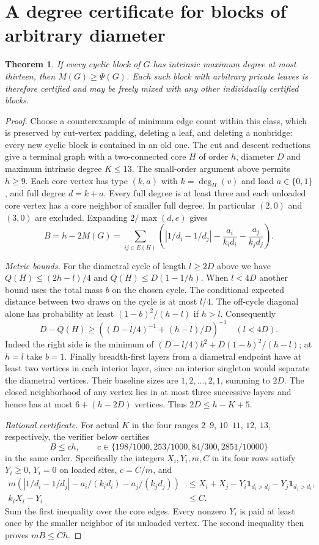 \documentclass[11pt,a4paper]{article}
\newtheorem{theorem}{Theorem}[section]
\begin{document}
\section{A degree certificate for blocks of arbitrary diameter}
\begin{theorem}\label{p12-thm:thirteen}
If every cyclic block of $G$ has intrinsic maximum degree at most
thirteen, then $M(G)\ge\Psi(G)$. Each such block with arbitrary
private leaves is therefore certified and may be freely mixed with
any other individually certified blocks.
\end{theorem}
\begin{proof}
Choose a counterexample of minimum edge count within this class, which
is preserved by cut-vertex padding, deleting a leaf, and deleting a
nonbridge: every new cyclic block is contained in an old one.
The cut and descent reductions give a terminal graph with a
two-connected core $H$ of order $h$, diameter $D$ and maximum intrinsic
degree $K\le13$. The small-order argument above permits $h\ge9$. Each core vertex has type $(k,a)$
with $k=\deg_H(v)$ and load $a\in\{0,1\}$, and full degree $d=k+a$.
Every full degree is at least three and each unloaded core vertex
has a core neighbor of smaller full degree. In particular $(2,0)$
and $(3,0)$ are excluded. Expanding $2/\max(d,e)$ gives
\[
 B=h-2M(G)=\sum_{ij\in E(H)}
 \left( |1/d_i-1/d_j|-\frac{a_i}{k_id_i}-\frac{a_j}{k_jd_j}\right).
\]

\emph{Metric bounds.} For the diametral cycle of length $l\ge2D$ above we have $Q(H)\le(2h-l)/4$ and $Q(H)\le D(1-1/h)$. When $l<4D$ another bound uses the total mass $b$ on the chosen cycle.
The conditional expected distance between two draws on the cycle is
at most $l/4$. The off-cycle diagonal alone has probability at least
$(1-b)^2/(h-l)$ if $h>l$. Consequently
\[
 D-Q(H)\ge
 \left((D-l/4)^{-1}+(h-l)/D\right)^{-1}\quad(l<4D).
\]
Indeed the right side is the minimum of
$(D-l/4)b^2+D(1-b)^2/(h-l)$; at $h=l$ take $b=1$.
Finally breadth-first layers from a diametral endpoint have at least
two vertices in each interior layer, since an interior singleton
would separate the diametral vertices. Their baseline sizes are
$1,2,\ldots,2,1$, summing to $2D$. The closed neighborhood of any
vertex lies in at most three successive layers and hence has at most
$6+(h-2D)$ vertices. Thus $2D\le h-K+5$.

\emph{Rational certificate.} For actual $K$ in the four ranges
$2$--$9$, $10$--$11$, $12$, $13$, respectively, the verifier below
certifies
\[
 B\le ch,\qquad c\in\{198/1000,253/1000,84/300,2851/10000\}
\]
in the same order. Specifically the integers $X_i,Y_i,m,C$ in its
four rows satisfy $Y_i\ge0$, $Y_i=0$ on loaded sites, $c=C/m$, and
\begin{align*}
 m\left(|1/d_i-1/d_j|-a_i/(k_i d_i)-a_j/(k_jd_j)\right)
 &\le X_i+X_j-Y_i\mathbf 1_{d_i>d_j}-Y_j\mathbf 1_{d_j>d_i},\\
 k_i X_i-Y_i &\le C.
\end{align*}
Sum the first inequality over the core edges. Every nonzero $Y_i$
is paid at least once by the smaller neighbor of its unloaded vertex.
The second inequality then proves $mB\le Ch$.


\end{proof}
\end{document}
